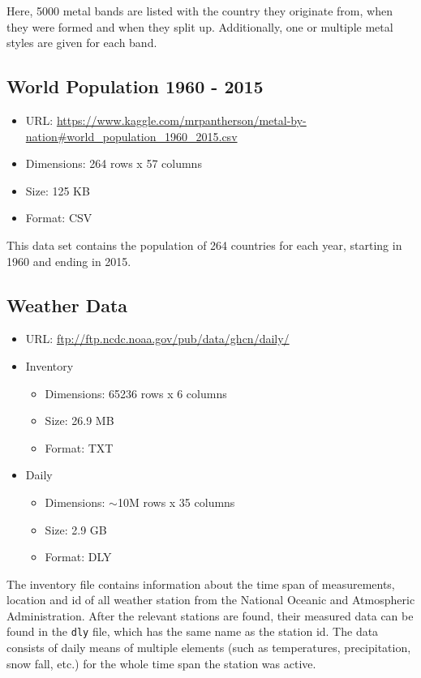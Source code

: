 Here, 5000 metal bands are listed with the country they originate from, when they were formed and when they split up. Additionally, one or multiple metal styles are given for each band.

\subsection{World Population 1960 - 2015}
\begin{itemize}
	\item URL: \url{https://www.kaggle.com/mrpantherson/metal-by-nation#world_population_1960_2015.csv}
	\item Dimensions: 264 rows x 57 columns
	\item Size: 125 KB
	\item Format: CSV
\end{itemize}

This data set contains the population of 264 countries for each year, starting in 1960 and ending in 2015.

\subsection{Weather Data}
\begin{itemize}
	\item URL: \url{ftp://ftp.ncdc.noaa.gov/pub/data/ghcn/daily/}
	\item Inventory
	\begin{itemize}
	  \item Dimensions: 65236 rows x 6 columns
	  \item Size: 26.9 MB
	  \item Format: TXT
    \end{itemize}
	\item Daily
	\begin{itemize}
	  \item Dimensions: $\sim$10M rows x 35 columns
	  \item Size: 2.9 GB
	  \item Format: DLY
    \end{itemize}
\end{itemize}

The inventory file contains information about the time span of measurements, location and id of all weather station from the National Oceanic and Atmospheric Administration. After the relevant stations are found, their measured data can be found in the \texttt{dly} file, which has the same name as the station id. The data consists of daily means of multiple elements (such as temperatures, precipitation, snow fall, etc.) for the whole time span the station was active.

